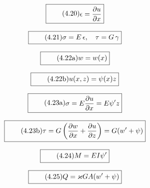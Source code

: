 \documentclass[11pt]{article}
\newcommand{\1}{ {\mathds{1}} }
\begin{document}
\begin{multicols}{2}
		\begin{equation}
			\boxed{
				\tag{4.20}
				\begin{split}
					\epsilon = \frac{\partial u}{\partial x}
				\end{split}
			}
		\end{equation}

		\begin{equation}
			\boxed{
				\tag{4.21}
				\begin{split}
					\sigma= E\,\epsilon, \quad \tau = G\,\gamma
				\end{split}
			}
		\end{equation}

		\begin{equation}
			\boxed{
				\tag{4.22a}
				\begin{split}
					w = w(x)
				\end{split}
			}
		\end{equation}

		\begin{equation}
			\boxed{
				\tag{4.22b}
				\begin{split}
					u(x,z) = \psi(x)z
				\end{split}
			}
		\end{equation}
		
		\begin{equation}
			\boxed{
				\tag{4.23a}
				\begin{split}
					\sigma = E\frac{\partial u}{\partial x} = E \psi' z
				\end{split}
			}
		\end{equation}

		\begin{equation}
			\boxed{
				\tag{4.23b}
				\begin{split}
					\tau = G\left( \frac{\partial w}{\partial x} + \frac{\partial u}{\partial z} \right) = G (w' + \psi)
				\end{split}
			}
		\end{equation}

		\begin{equation}
			\boxed{
				\tag{4.24}
				\begin{split}
					M = E I \psi'
				\end{split}
			}
		\end{equation}

		\begin{equation}
			\boxed{
				\tag{4.25}
				\begin{split}
					Q = \varkappa GA(w' +\psi)
				\end{split}
			}
		\end{equation}
		

\end{multicols}
\end{document}
